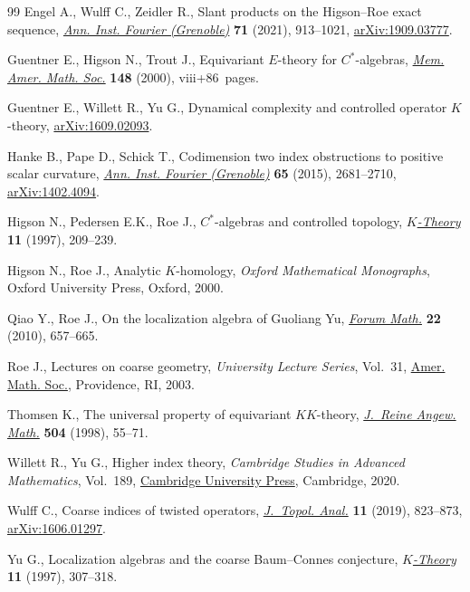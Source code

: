 \documentclass[11pt]{article}
\numberwithin{equation}{section}
\numberwithin{equation}{section}
\theoremstyle{definition}
\begin{document}
\begin{thebibliography}{99}
Engel A., Wulff C., Zeidler R., Slant products on the {H}igson--{R}oe exact
 sequence, \href{https://doi.org/10.5802/aif.3406}{\textit{Ann. Inst. Fourier (Grenoble)}} \textbf{71} (2021),
 913--1021, \href{https://arxiv.org/abs/1909.03777}{arXiv:1909.03777}.

Guentner E., Higson N., Trout J., Equivariant {$E$}-theory for
 {$C^*$}-algebras, \href{https://doi.org/10.1090/memo/0703}{\textit{Mem. Amer. Math. Soc.}} \textbf{148} (2000),
 viii+86~pages.

Guentner E., Willett R., Yu G., Dynamical complexity and controlled operator
 {$K$}-theory, \href{https://arxiv.org/abs/1609.02093}{arXiv:1609.02093}.

Hanke B., Pape D., Schick T., Codimension two index obstructions to positive
 scalar curvature, \href{https://doi.org/10.5802/aif.3000}{\textit{Ann. Inst. Fourier (Grenoble)}} \textbf{65} (2015),
 2681--2710, \href{https://arxiv.org/abs/1402.4094}{arXiv:1402.4094}.

Higson N., Pedersen E.K., Roe J., {$C^\ast$}-algebras and controlled topology,
 \href{https://doi.org/10.1023/A:1007705726771}{\textit{$K$-Theory}} \textbf{11} (1997), 209--239.

Higson N., Roe J., Analytic {$K$}-homology, \textit{Oxford Mathematical Monographs},
 Oxford University Press, Oxford, 2000.

Qiao Y., Roe J., On the localization algebra of {G}uoliang {Y}u, \href{https://doi.org/10.1515/FORUM.2010.036}{\textit{Forum
 Math.}} \textbf{22} (2010), 657--665.

Roe J., Lectures on coarse geometry, \textit{University Lecture Series},
 Vol.~31, \href{https://doi.org/10.1090/ulect/031}{Amer. Math. Soc.}, Providence, RI, 2003.

Thomsen K., The universal property of equivariant {$KK$}-theory,
 \href{https://doi.org/10.1515/crll.1998.112}{\textit{J.~Reine Angew. Math.}} \textbf{504} (1998), 55--71.

Willett R., Yu G., Higher index theory, \textit{Cambridge Studies in Advanced
 Mathematics}, Vol.~189, \href{https://doi.org/10.1017/9781108867351}{Cambridge University Press}, Cambridge, 2020.

Wulff C., Coarse indices of twisted operators, \href{https://doi.org/10.1142/s179352531950033x}{\textit{J.~Topol. Anal.}}
 \textbf{11} (2019), 823--873, \href{https://arxiv.org/abs/1606.01297}{arXiv:1606.01297}.

Yu G., Localization algebras and the coarse {B}aum--{C}onnes conjecture,
 \href{https://doi.org/10.1023/a:1007766031161}{\textit{$K$-Theory}} \textbf{11} (1997), 307--318.

\end{thebibliography}
\end{document}

